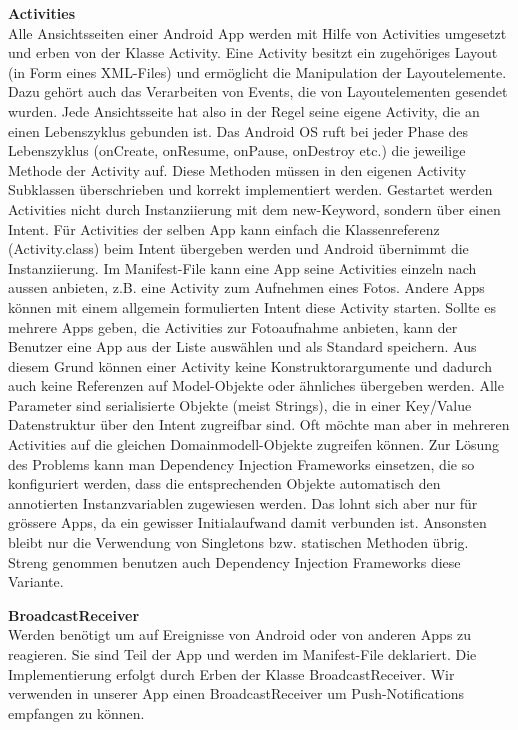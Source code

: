 \textbf{Activities}\\
Alle Ansichtsseiten einer Android App werden mit Hilfe von Activities umgesetzt und erben von der Klasse Activity. Eine Activity besitzt ein zugehöriges Layout (in Form eines XML-Files) und ermöglicht die Manipulation der Layoutelemente. Dazu gehört auch das Verarbeiten von Events, die von Layoutelementen gesendet wurden. Jede Ansichtsseite hat also in der Regel seine eigene Activity, die an einen Lebenszyklus gebunden ist. Das Android OS ruft bei jeder Phase des Lebenszyklus (onCreate, onResume, onPause, onDestroy etc.) die jeweilige Methode der Activity auf. Diese Methoden müssen in den eigenen Activity Subklassen überschrieben und korrekt implementiert werden. Gestartet werden Activities nicht durch Instanziierung mit dem new-Keyword, sondern über einen Intent. Für Activities der selben App kann einfach die Klassenreferenz (Activity.class) beim Intent übergeben werden und Android übernimmt die Instanziierung. Im Manifest-File kann eine App seine Activities einzeln nach aussen anbieten, z.B. eine Activity zum Aufnehmen eines Fotos. Andere Apps können mit einem allgemein formulierten Intent diese Activity starten. Sollte es mehrere Apps geben, die Activities zur Fotoaufnahme anbieten, kann der Benutzer eine App aus der Liste auswählen und als Standard speichern. Aus diesem Grund können einer Activity keine Konstruktorargumente und dadurch auch keine Referenzen auf Model-Objekte oder ähnliches übergeben werden. Alle Parameter sind serialisierte Objekte (meist Strings), die in einer Key/Value Datenstruktur über den Intent zugreifbar sind. Oft möchte man aber in mehreren Activities auf die gleichen Domainmodell-Objekte zugreifen können. Zur Lösung des Problems kann man Dependency Injection Frameworks einsetzen, die so konfiguriert werden, dass die entsprechenden Objekte automatisch den annotierten Instanzvariablen zugewiesen werden. Das lohnt sich aber nur für grössere Apps, da ein gewisser Initialaufwand damit verbunden ist. Ansonsten bleibt nur die Verwendung von Singletons bzw. statischen Methoden übrig. Streng genommen benutzen auch Dependency Injection Frameworks diese Variante.

\textbf{BroadcastReceiver}\\
Werden benötigt um auf Ereignisse von Android oder von anderen Apps zu reagieren. Sie sind Teil der App und werden im Manifest-File deklariert. Die Implementierung erfolgt durch Erben der Klasse BroadcastReceiver. Wir verwenden in unserer App einen BroadcastReceiver um Push-Notifications empfangen zu können.

